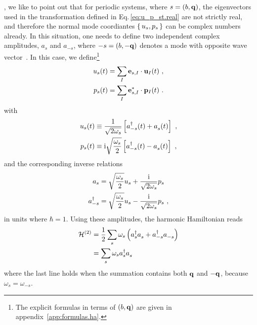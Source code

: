 , we like to point out that for periodic systems, where $s=(b, {\bf q})$, the eigenvectors used in the transformation defined in Eq.\,\eqref{eq:u_p_st.real} are not strictly real, and therefore the normal mode coordiantes $\set{u_s, p_s}$ can be complex numbers already. In this situation, one needs to define two independent complex amplitudes, $a_s$ and $a_{-s}$, where $-s = (b, - {\bf q})$ denotes a mode with opposite wave vector~\cite[p.\,300]{BornHuang}. In this case, we define\footnote{The explicit formulas in terms of $(b, {\bf q})$ are given in appendix~\ref{app:formulas.ha}.}
\begin{subequations}
	\label{eq:u_s.periodic}
\begin{align}
u_s (t)
&= \sum_{I} {\bf e}_{s, I} \cdot {\bf u}_{I} (t)~,
\label{eq:u_st)} \\
p_s (t)
&=\sum_{I} {\bf e}^\ast_{s, I} \cdot {\bf p}_{I} (t) ~.
\label{eq:p_st.periodic}
\end{align}
\end{subequations}
%
%
with
\begin{subequations}
	\label{eq:u_s.amplitudes.periodic}
	\begin{align}
	u_s (t) 
	&\equiv \frac{1}{\sqrt{2 \omega_{s}}} \left[ \D a_{-s} (t) + \fD a_s (t) \right]~, \\
	p_s (t) 
	&\equiv \im \sqrt{\frac{\omega_s}{2}} \left[ \D a_{-s} (t) - \fD a_s (t) \right]~,
	\end{align}
\end{subequations}
and the corresponding inverse relations
\begin{subequations}
	\label{eq:a(q)}
	\begin{align}
	a_s
	&= \sqrt{\frac{\omega_s}{2}} u_s + \frac{{\rm i}}{\sqrt{2 \omega_s}} p_s \\
	a^\dagger_{-s}
	&= \sqrt{\frac{\omega_s}{2}} u_s - \frac{{\rm i}}{\sqrt{2 \omega_s}} p_s~,
	\end{align}
\end{subequations}
in units where $\hbar = 1$. Using these amplitudes, the harmonic Hamiltonian reads
\begin{align}
	\mathcal{H}^{(2)}
		&= \halb \sum_s \omega_s \left( \D a_s \fD a_s + \D a_{-s} \fD a_{-s} \right) \\
		&= \sum_s \omega_s \D a_s \fD a_s
\end{align}
where the last line holds when the summation contains both $\bf q$ and $- {\bf q}$, because $\omega_s = \omega_{-s}$.


